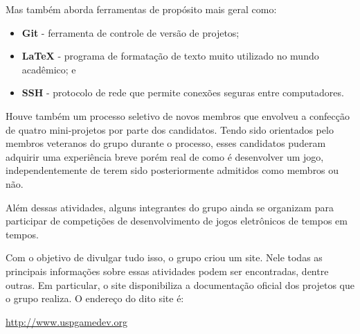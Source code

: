 \documentclass[12pt,onecolumn,a4paper]{article}
\begin{document}
        Mas também aborda ferramentas de propósito mais geral como:
        
        \begin{itemize}
        
            \item {\bf Git \footnotemark} - ferramenta de controle de versão de projetos;
            
            \item {\bf \LaTeX \footnotemark} - programa de formatação de texto muito utilizado no
                                               mundo acadêmico; e
            
            \item {\bf SSH \footnotemark} - protocolo de rede que permite conexões seguras entre
                                            computadores.
        
        \end{itemize}
        
        Houve também um processo seletivo de novos membros que envolveu a confecção de quatro
        mini-projetos por parte dos candidatos. Tendo sido orientados pelo membros veteranos do
        grupo durante o processo, esses candidatos puderam adquirir uma experiência breve porém real
        de como é desenvolver um jogo, independentemente de terem sido posteriormente admitidos como
        membros ou não.
        
        Além dessas atividades, alguns integrantes do grupo ainda se organizam para participar de
        competições de desenvolvimento de jogos eletrônicos de tempos em tempos.
        
        Com o objetivo de divulgar tudo isso, o grupo criou um site. Nele todas as principais
        informações sobre essas atividades podem ser encontradas, dentre outras. Em particular, o
        site disponibiliza a documentação oficial dos projetos que o grupo realiza. O endereço do
        dito site é:
        
        \begin{center}
            \footnotesize
            \url{http://www.uspgamedev.org}
        \end{center}
    
\end{document}
